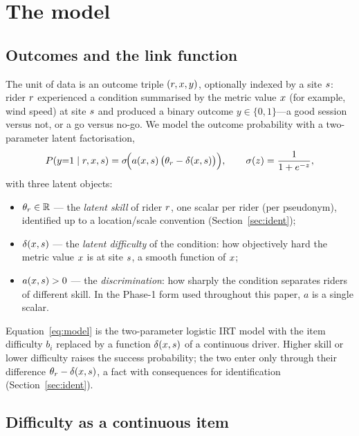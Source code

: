\section{The model}
\label{sec:model}

\subsection{Outcomes and the link function}

The unit of data is an outcome triple $(r, x, y)$, optionally indexed
by a site $s$: rider $r$ experienced a condition summarised by the metric
value $x$ (for example, wind speed) at site $s$ and produced a binary
outcome $y \in \{0,1\}$---a good session versus not, or a go versus no-go. We
model the outcome probability with a two-parameter latent factorisation,
\begin{equation}
  \label{eq:model}
  P(y{=}1 \mid r, x, s)
    = \sigma\!\Big( a(x,s)\,\big(\theta_r - \delta(x,s)\big) \Big),
  \qquad \sigma(z) = \frac{1}{1+e^{-z}},
\end{equation}
with three latent objects:
\begin{itemize}
  \item $\theta_r \in \mathbb{R}$ --- the \emph{latent skill} of rider
    $r$, one scalar per rider (per pseudonym), identified up to a
    location/scale convention (Section~\ref{sec:ident});
  \item $\delta(x,s)$ --- the \emph{latent difficulty} of the condition:
    how objectively hard the metric value $x$ is at site $s$, a smooth
    function of $x$;
  \item $a(x,s) > 0$ --- the \emph{discrimination}: how sharply the
    condition separates riders of different skill. In the Phase-1 form used
    throughout this paper, $a$ is a single scalar.
\end{itemize}
Equation~\eqref{eq:model} is the two-parameter logistic IRT model with the item
difficulty $b_i$ replaced by a function $\delta(x,s)$ of a continuous
driver. Higher skill or lower difficulty raises the success probability; the two
enter only through their difference $\theta_r - \delta(x,s)$, a fact
with consequences for identification (Section~\ref{sec:ident}).

\subsection{Difficulty as a continuous item}

